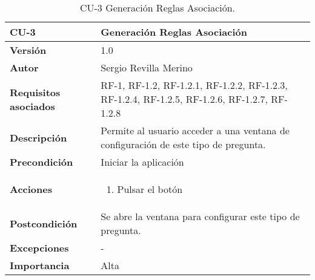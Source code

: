 \begin{table}[h]
	\centering
	\begin{tabularx}{\linewidth}{ p{} p{} }
		\toprule
		\textbf{CU-3}    & \textbf{Generación Reglas Asociación}\\
		\toprule
		\textbf{Versión}              & 1.0    \\
		\textbf{Autor}                & Sergio Revilla Merino \\
		\textbf{Requisitos asociados} & RF-1, RF-1.2, RF-1.2.1, RF-1.2.2, RF-1.2.3, RF-1.2.4, RF-1.2.5, RF-1.2.6, RF-1.2.7, RF-1.2.8 \\
		\textbf{Descripción}          & Permite al usuario acceder a una ventana de configuración de este tipo de pregunta.  \\
		\textbf{Precondición}         & Iniciar la aplicación \\
		\textbf{Acciones}             &
		\begin{enumerate}
			\def\labelenumi{\arabic{enumi}.}
			\tightlist
            \item Pulsar el botón
		\end{enumerate} \\
		\textbf{Postcondición}        & Se abre la ventana para configurar este tipo de pregunta. \\
		\textbf{Excepciones}          & - \\
		\textbf{Importancia}          & Alta \\
		\bottomrule
	\end{tabularx}
	\caption{CU-3 Generación Reglas Asociación.}
\end{table}

